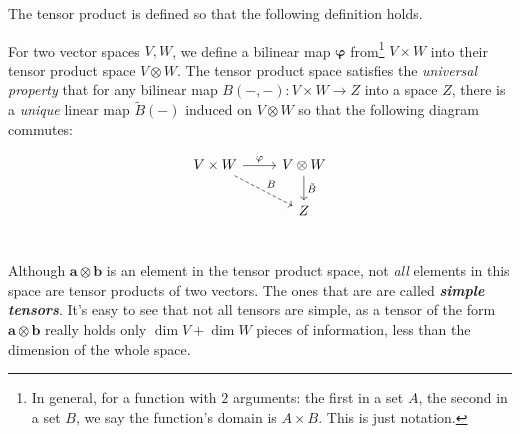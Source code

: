 \documentclass[../master.tex]{subfiles}
\begin{document}
	
	\begin{view}
		The tensor product is defined so that the following definition holds.
	\end{view}
	
	\begin{defn}
		For two vector spaces $V,W$, we define a bilinear map $\mathbf \varphi$ from\footnote{In general, for a function with $2$ arguments: the first in a set $A$, the second in a set $B$, we say the function's domain is $A\times B$. This is just notation.} $V \times W$ into their tensor product space $V \otimes W$. The tensor product space satisfies the \emph{universal property} that for any bilinear map $B(-,-): V \times W \rightarrow Z$ into a space $Z$, there is a \emph{unique} linear map $\tilde B(-)$ induced on $V \otimes W$ so that the following diagram commutes:
		
		\[ 
		\begin{tikzcd}
		V \times W \arrow{r}{\varphi} \arrow[dashrightarrow]{rd}{B} & V \otimes W \arrow{d}{\tilde B} \\
		  & Z \\
		\end{tikzcd}
		\]
		
	\end{defn}
	\begin{nb}
		Although $\mathbf a \otimes \mathbf b$ is an element in the tensor product space, not \emph{all} elements in this space are tensor products of two vectors. The ones that are are called \emph{\textbf{simple tensors}}. It's easy to see that not all tensors are simple, as a tensor of the form $\mathbf a \otimes \mathbf b$ really holds only $\dim V + \dim W$ pieces of information, less than the dimension of the whole space.
	\end{nb}
	
\end{document}
